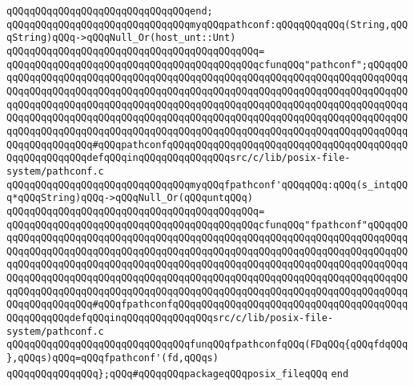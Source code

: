 \verb|qQQqqQQqqQQqqQQqqQQqqQQqqQQqqQQqend;|\newline
\newline
\verb|qQQqqQQqqQQqqQQqqQQqqQQqqQQqqQQqmyqQQqpathconf:qQQqqQQqqQQq(String,qQQqString)qQQq->qQQqNull_Or(host_unt::Unt)|\newline
\verb|qQQqqQQqqQQqqQQqqQQqqQQqqQQqqQQqqQQqqQQqqQQq=|\newline
\verb|qQQqqQQqqQQqqQQqqQQqqQQqqQQqqQQqqQQqqQQqqQQqcfunqQQq"pathconf";qQQqqQQqqQQqqQQqqQQqqQQqqQQqqQQqqQQqqQQqqQQqqQQqqQQqqQQqqQQqqQQqqQQqqQQqqQQqqQQqqQQqqQQqqQQqqQQqqQQqqQQqqQQqqQQqqQQqqQQqqQQqqQQqqQQqqQQqqQQqqQQqqQQqqQQqqQQqqQQqqQQqqQQqqQQqqQQqqQQqqQQqqQQqqQQqqQQqqQQqqQQqqQQqqQQqqQQqqQQqqQQqqQQqqQQqqQQqqQQqqQQqqQQqqQQqqQQqqQQqqQQqqQQqqQQqqQQqqQQqqQQqqQQqqQQqqQQqqQQqqQQqqQQqqQQqqQQqqQQqqQQqqQQqqQQqqQQqqQQqqQQqqQQqqQQqqQQqqQQqqQQqqQQqqQQq#qQQqpathconfqQQqqQQqqQQqqQQqqQQqqQQqqQQqqQQqqQQqqQQqqQQqqQQqqQQqqQQqdefqQQqinqQQqqQQqqQQqqQQqsrc/c/lib/posix-file-system/pathconf.c|\newline
\newline
\verb|qQQqqQQqqQQqqQQqqQQqqQQqqQQqqQQqmyqQQqfpathconf'qQQqqQQq:qQQq(s_intqQQq*qQQqString)qQQq->qQQqNull_Or(qQQquntqQQq)|\newline
\verb|qQQqqQQqqQQqqQQqqQQqqQQqqQQqqQQqqQQqqQQqqQQq=|\newline
\verb|qQQqqQQqqQQqqQQqqQQqqQQqqQQqqQQqqQQqqQQqqQQqcfunqQQq"fpathconf"qQQqqQQqqQQqqQQqqQQqqQQqqQQqqQQqqQQqqQQqqQQqqQQqqQQqqQQqqQQqqQQqqQQqqQQqqQQqqQQqqQQqqQQqqQQqqQQqqQQqqQQqqQQqqQQqqQQqqQQqqQQqqQQqqQQqqQQqqQQqqQQqqQQqqQQqqQQqqQQqqQQqqQQqqQQqqQQqqQQqqQQqqQQqqQQqqQQqqQQqqQQqqQQqqQQqqQQqqQQqqQQqqQQqqQQqqQQqqQQqqQQqqQQqqQQqqQQqqQQqqQQqqQQqqQQqqQQqqQQqqQQqqQQqqQQqqQQqqQQqqQQqqQQqqQQqqQQqqQQqqQQqqQQqqQQqqQQqqQQqqQQqqQQqqQQqqQQqqQQqqQQqqQQqqQQq#qQQqfpathconfqQQqqQQqqQQqqQQqqQQqqQQqqQQqqQQqqQQqqQQqqQQqqQQqqQQqdefqQQqinqQQqqQQqqQQqqQQqsrc/c/lib/posix-file-system/pathconf.c|\newline
\newline
\verb|qQQqqQQqqQQqqQQqqQQqqQQqqQQqqQQqfunqQQqfpathconfqQQq(FDqQQq{qQQqfdqQQq},qQQqs)qQQq=qQQqfpathconf'(fd,qQQqs)|\newline
\newline
\verb|qQQqqQQqqQQqqQQq};qQQq#qQQqqQQqpackageqQQqposix_fileqQQq|\newline
\verb|end|\newline
\newline
\newline

